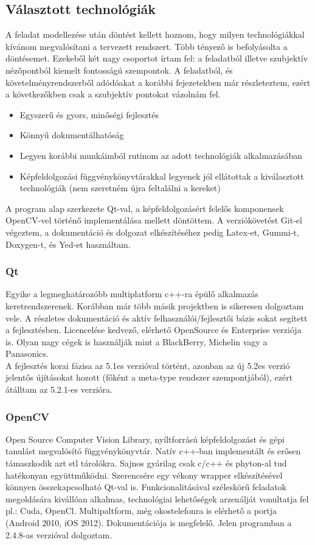 \documentclass[a4paper,12pt,oneside]{report}
\begin{document}
\subsection{Választott technológiák}
A feladat modellezése után döntést kellett hoznom, hogy milyen technológiákkal kívánom megvalósítani a tervezett rendszert. Több tényező is befolyásolta a döntésemet. Ezekeből két nagy csoportot írtam fel: a feladatból illetve szubjektív nézőpontból kiemelt fontosságú szempontok. A feladatból, és követelményrendszerből adódóakat a korábbi fejezetekben már részleteztem, ezért a következőkben csak a szubjektív pontokat vázolnám fel.
\begin{itemize}
	\itemsep0em
	\item Egyszerű és gyors, minőségi fejlesztés
	\item Könnyű dokumentálhatóság
	\item Legyen korábbi munkáimból rutinom az adott technológiák alkalmazásában
	\item Képfeldolgozási függvénykönyvtárakkal legyenek jól ellátottak a kiválasztott technológiák (nem szeretném újra feltalálni a kereket)
\end{itemize}
A program alap szerkezete Qt-val, a képfeldolgozásért felelős komponensek OpenCV-vel történő implementálása mellett döntöttem. A verziókövetést Git-el végeztem, a dokumentáció és dolgozat elkészítéséhez pedig Latex-et, Gummi-t, Doxygen-t, és Yed-et használtam.
\subsubsection{Qt}
Egyike a legmeghatározóbb\cite{website:qt_1_million} multiplatform c++-ra épülő alkalmazás keretrendszerenek. \cite{website:qt_about} Korábban már több másik projektben is sikeresen dolgoztam vele. A részletes dokumentáció és aktív felhasználói/fejlesztői bázis sokat segített a fejlesztésben. \cite{website:qt_dochome} \cite{website:qt_docforum}\cite{website:qt_docmaillist} Licencelése kedvező, elérhető OpenSource és Enterprise verziója is. Olyan nagy cégek is használják mint a BlackBerry, Michelin vagy a Panasonics.\cite{website:qt_in_use} \\ A fejlesztés korai fázisa az 5.1es verzióval történt, azonban az új 5.2es verzió jelentős újításokat hozott (főként a meta-type rendszer szempontjából), ezért átálltam az 5.2.1-es verzióra.


\subsubsection{OpenCV}	
Open Source Computer Vision Library, nyíltforrású képfeldolgozást és gépi tanulást megvalósító függvénykönyvtár.\cite{website:opencv_about} Natív c++-ban implementált és erősen támaszkodik azt stl tárolókra. Sajnos gyárilag csak c/c++ és phyton-al tud hatékonyan együttműködni. Szerencsére egy vékony wrapper elkészítésével könnyen összekapcsolható Qt-val is. Funkcionalitásával széleskörű feladatok megoldására kivállóan alkalmas, technológiai lehetőségek arzenálját vonultatja fel pl.: Cuda, OpenCl. Multipaltform, még okostelefonra is elérhető a portja (Android 2010, iOS 2012). Dokumentációja is megfelelő. Jelen programban a 2.4.8-as verzióval dolgoztam.
\end{document}
